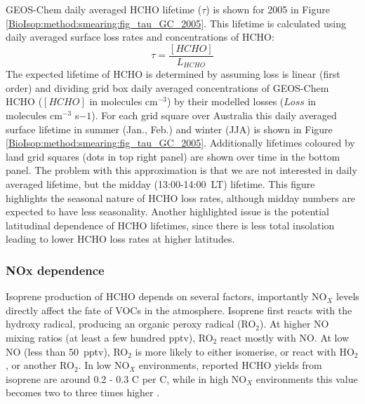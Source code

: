       GEOS-Chem daily averaged HCHO lifetime ($\tau$) is shown for 2005 in Figure \ref{BioIsop:method:smearing:fig_tau_GC_2005}.
      This lifetime is calculated using daily averaged surface loss rates and concentrations of HCHO:
      \begin{equation*}
      \tau = \frac{[HCHO]}{L_{HCHO}}
      \end{equation*}
      The expected lifetime of HCHO is determined by assuming loss is linear (first order) and dividing grid box daily averaged concentrations of GEOS-Chem HCHO ($[HCHO]$ in molecules cm$^{-3}$) by their modelled losses ($Loss$ in molecules cm$^{-3}$ s${-1}$).
      For each grid square over Australia this daily averaged surface lifetime in summer (Jan., Feb.) and winter (JJA) is shown in Figure \ref{BioIsop:method:smearing:fig_tau_GC_2005}.
      Additionally lifetimes coloured by land grid squares (dots in top right panel) are shown over time in the bottom panel.
      The problem with this approximation is that we are not interested in daily averaged lifetime, but the midday (13:00-14:00~LT) lifetime.
      This figure highlights the seasonal nature of HCHO loss rates, although midday numbers are expected to have less seasonality.
      Another highlighted issue is the potential latitudinal dependence of HCHO lifetimes, since there is less total insolation leading to lower HCHO loss rates at higher latitudes.
      
      
      
    
    \subsubsection{NOx dependence}
      
      Isoprene production of HCHO depends on several factors, importantly NO$_X$ levels directly affect the fate of VOCs in the atmosphere.
      Isoprene first reacts with the hydroxy radical, producing an organic peroxy radical (RO$_2$).
      At higher NO mixing ratios (at least a few hundred pptv), RO$_2$ react mostly with NO. 
      At low NO (less than 50~pptv), RO$_2$ is more likely to either isomerise, or react with HO$_2$, or another RO$_2$.
      In low NO$_X$ environments, reported HCHO yields from isoprene are around 0.2 - 0.3 C per C, while in high NO$_X$ environments this value becomes two to three times higher \parencite{Palmer2003, Wolfe2016}.

